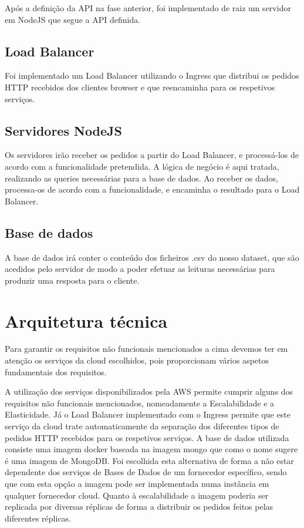 \documentclass[11pt,a4paper]{article}
\begin{document}
Após a definição da API na fase anterior, foi implementado de raiz um servidor em NodeJS que segue a API definida.


\subsection{Load Balancer}
Foi implementado um Load Balancer utilizando o Ingress que distribui os pedidos HTTP recebidos dos clientes browser e que reencaminha para os respetivos serviços.


\subsection{Servidores NodeJS}
Os servidores irão receber os pedidos a partir do Load Balancer, e processá-los de acordo com a funcionalidade pretendida. A lógica de negócio é aqui tratada, realizando as queries necessárias para a base de dados. Ao receber os dados, processa-os de acordo com a funcionalidade, e encaminha o resultado para o Load Balancer.

\subsection{Base de dados}
A base de dados irá conter o conteúdo dos ficheiros .csv do nosso dataset, que são acedidos pelo servidor de modo a poder efetuar as leituras necessárias para produzir uma resposta para o cliente. 

\section{Arquitetura técnica}

Para garantir os requisitos não funcionais mencionados a cima devemos ter em atenção os serviços da cloud escolhidos, pois proporcionam vários aspetos fundamentais dos requisitos.
\newline

A utilização dos serviços disponibilizados pela AWS permite cumprir alguns dos requisitos não funcionais mencionados, nomeadamente a Escalabilidade e a Elasticidade. Já o Load Balancer implementado com o Ingress permite que este serviço da cloud trate automaticamente da separação dos diferentes tipos de pedidos HTTP recebidos para os respetivos serviços. A base de dados utilizada consiste uma imagem docker baseada na imagem mongo que como o nome sugere é uma imagem de MongoDB. Foi escolhida esta alternativa de forma a não estar dependente dos serviços de Bases de Dados de um fornecedor específico, sendo que com esta opção a imagem pode ser implementada numa instância em qualquer fornecedor cloud. Quanto à escalabilidade a imagem poderia ser replicada por diversas réplicas de forma a distribuir os pedidos feitos pelas diferentes réplicas.  %
\newline
\end{document}
